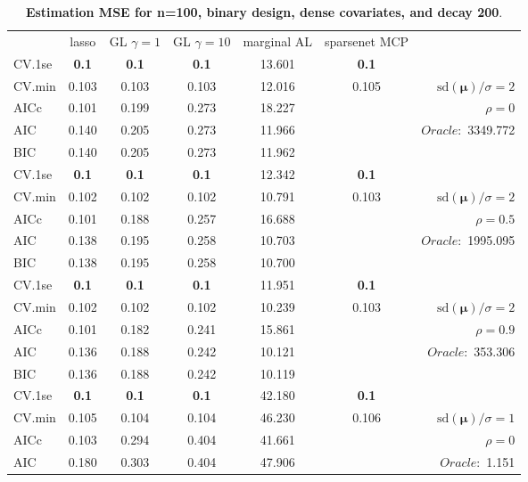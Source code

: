 \clearpage
\begin{table}\vspace{-.5cm}
\caption[l]{ { \bf Estimation MSE for n=100, binary design, 
dense covariates, and  decay  200}.}
\vspace{-.5cm}
\footnotesize{}
\begin{center}
\begin{tabular}{l*{5}{c}|r}
& lasso & GL $\gamma=1$ & GL $\gamma=10$ & marginal AL & sparsenet MCP  & \\
 \cline{1-7}
CV.1se & {\bf 0.1} & {\bf 0.1} & {\bf 0.1} & 13.601 & {\bf 0.1} & \\
CV.min & 0.103 & 0.103 & 0.103 & 12.016 & 0.105 &  $\mathrm{sd}(\mathbf{\mu})/\sigma=2$ \\
AICc & 0.101 & 0.199 & 0.273 & 18.227 & & $\rho=0$ \\
AIC & 0.140 & 0.205 & 0.273 & 11.966 & &  \multirow{2}{*}{$Oracle: $ 3349.772} \\
BIC & 0.140 & 0.205 & 0.273 & 11.962 & &  \\
 \hline 
CV.1se & {\bf 0.1} & {\bf 0.1} & {\bf 0.1} & 12.342 & {\bf 0.1} & \\
CV.min & 0.102 & 0.102 & 0.102 & 10.791 & 0.103 &  $\mathrm{sd}(\mathbf{\mu})/\sigma=2$ \\
AICc & 0.101 & 0.188 & 0.257 & 16.688 & & $\rho=0.5$ \\
AIC & 0.138 & 0.195 & 0.258 & 10.703 & &  \multirow{2}{*}{$Oracle: $ 1995.095} \\
BIC & 0.138 & 0.195 & 0.258 & 10.700 & &  \\
 \hline 
CV.1se & {\bf 0.1} & {\bf 0.1} & {\bf 0.1} & 11.951 & {\bf 0.1} & \\
CV.min & 0.102 & 0.102 & 0.102 & 10.239 & 0.103 &  $\mathrm{sd}(\mathbf{\mu})/\sigma=2$ \\
AICc & 0.101 & 0.182 & 0.241 & 15.861 & & $\rho=0.9$ \\
AIC & 0.136 & 0.188 & 0.242 & 10.121 & &  \multirow{2}{*}{$Oracle: $ 353.306} \\
BIC & 0.136 & 0.188 & 0.242 & 10.119 & &  \\
 \hline 
CV.1se & {\bf 0.1} & {\bf 0.1} & {\bf 0.1} & 42.180 & {\bf 0.1} & \\
CV.min & 0.105 & 0.104 & 0.104 & 46.230 & 0.106 &  $\mathrm{sd}(\mathbf{\mu})/\sigma=1$ \\
AICc & 0.103 & 0.294 & 0.404 & 41.661 & & $\rho=0$ \\
AIC & 0.180 & 0.303 & 0.404 & 47.906 & &  \multirow{2}{*}{$Oracle: $ 1.151} \\

\end{tabular}
\end{center}
\end{table}
